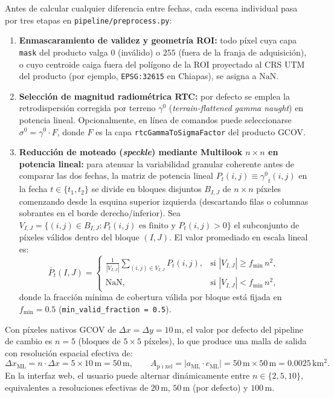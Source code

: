 \documentclass[11pt,a4paper]{article}
\newcommand{\src}[1]{\nolinkurl{#1}}
\newcommand{\unit}[1]{\mathrm{#1}}
\newcommand{\gz}{\ensuremath{\gamma^{0}}}
\newcommand{\sz}{\ensuremath{\sigma^{0}}}
\begin{document}
Antes de calcular cualquier diferencia entre fechas, cada escena individual pasa por tres etapas en
\src{pipeline/preprocess.py}:
\begin{enumerate}
  \item \textbf{Enmascaramiento de validez y geometría ROI:} todo píxel cuya capa \texttt{mask} del producto
        valga $0$ (inválido) o $255$ (fuera de la franja de adquisición), o cuyo centroide caiga fuera del
        polígono de la ROI proyectado al CRS UTM del producto (por ejemplo, \texttt{EPSG:32615} en Chiapas),
        se asigna a $\mathrm{NaN}$.
  \item \textbf{Selección de magnitud radiométrica RTC:} por defecto se emplea la retrodispersión corregida por
        terreno $\gz$ (\emph{terrain-flattened gamma naught}) en potencia lineal. Opcionalmente, en línea de
        comandos puede seleccionarse $\sz = \gz \cdot F$, donde $F$ es la capa \texttt{rtcGammaToSigmaFactor}
        del producto GCOV.
  \item \textbf{Reducción de moteado (\emph{speckle}) mediante Multilook $n\times n$ en potencia lineal:}
        para atenuar la variabilidad granular coherente antes de comparar las dos fechas, la matriz de potencia
        lineal $P_t(i,j) \equiv \gz_t(i,j)$ en la fecha $t \in \{t_1, t_2\}$ se divide en bloques disjuntos
        $B_{I,J}$ de $n\times n$ píxeles comenzando desde la esquina superior izquierda (descartando filas o
        columnas sobrantes en el borde derecho/inferior). Sea $V_{I,J} = \{(i,j) \in B_{I,J} : P_t(i,j) \text{ es finito y } P_t(i,j) > 0\}$
        el subconjunto de píxeles válidos dentro del bloque $(I,J)$. El valor promediado en escala lineal es:
        \begin{equation}
          \bar{P}_t(I,J) =
          \begin{cases}
            \displaystyle\frac{1}{|V_{I,J}|} \sum_{(i,j)\in V_{I,J}} P_t(i,j), & \text{si } |V_{I,J}| \ge f_{\min}\,n^2, \\[10pt]
            \mathrm{NaN}, & \text{si } |V_{I,J}| < f_{\min}\,n^2,
          \end{cases}
          \label{eq:cambio-multilook-lineal}
        \end{equation}
        donde la fracción mínima de cobertura válida por bloque está fijada en $f_{\min} = 0.5$
        (\texttt{min\_valid\_fraction = 0.5}).
\end{enumerate}

Con píxeles nativos GCOV de $\Delta x = \Delta y = 10\,\unit{m}$, el valor por defecto del pipeline de cambio
es $n = 5$ (bloques de $5\times 5$ píxeles), lo que produce una malla de salida con resolución espacial efectiva
de:
\begin{equation}
  \Delta x_{\mathrm{ML}} = n \cdot \Delta x = 5 \times 10\,\unit{m} = 50\,\unit{m}, \qquad
  A_{\mathrm{p\acute{\imath}xel}} = |a_{\mathrm{ML}} \cdot e_{\mathrm{ML}}| = 50\,\unit{m} \times 50\,\unit{m} = 0.0025\,\unit{km^2}.
  \label{eq:cambio-res-50m}
\end{equation}
En la interfaz web, el usuario puede alternar dinámicamente entre $n \in \{2, 5, 10\}$, equivalentes a
resoluciones efectivas de $20\,\unit{m}$, $50\,\unit{m}$ (por defecto) y $100\,\unit{m}$.
\end{document}
